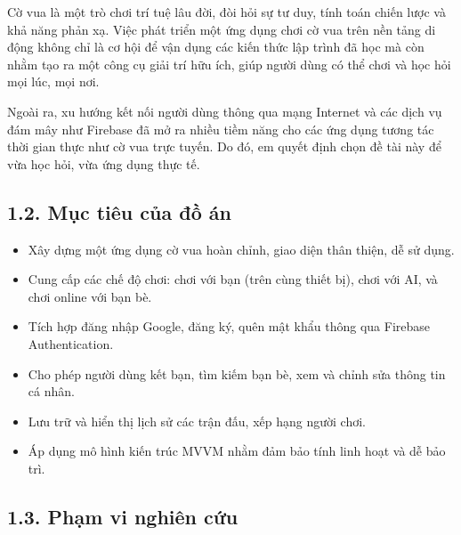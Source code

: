 \documentclass[a4paper,12pt]{article}
\begin{document}
\justify %
\noindent Cờ vua là một trò chơi trí tuệ lâu đời, đòi hỏi sự tư duy, tính toán chiến lược và khả năng phản xạ. Việc phát triển một ứng dụng chơi cờ vua trên nền tảng di động không chỉ là cơ hội để vận dụng các kiến thức lập trình đã học mà còn nhằm tạo ra một công cụ giải trí hữu ích, giúp người dùng có thể chơi và học hỏi mọi lúc, mọi nơi.

\noindent Ngoài ra, xu hướng kết nối người dùng thông qua mạng Internet và các dịch vụ đám mây như Firebase đã mở ra nhiều tiềm năng cho các ứng dụng tương tác thời gian thực như cờ vua trực tuyến. Do đó, em quyết định chọn đề tài này để vừa học hỏi, vừa ứng dụng thực tế.

\subsection*{1.2. Mục tiêu của đồ án} %

\justify
\begin{itemize}[label=·] %
    \item Xây dựng một ứng dụng cờ vua hoàn chỉnh, giao diện thân thiện, dễ sử dụng.
    \item Cung cấp các chế độ chơi: chơi với bạn (trên cùng thiết bị), chơi với AI, và chơi online với bạn bè.
    \item Tích hợp đăng nhập Google, đăng ký, quên mật khẩu thông qua Firebase Authentication.
    \item Cho phép người dùng kết bạn, tìm kiếm bạn bè, xem và chỉnh sửa thông tin cá nhân.
    \item Lưu trữ và hiển thị lịch sử các trận đấu, xếp hạng người chơi.
    \item Áp dụng mô hình kiến trúc MVVM nhằm đảm bảo tính linh hoạt và dễ bảo trì.
\end{itemize}

\subsection*{1.3. Phạm vi nghiên cứu}
\end{document}
